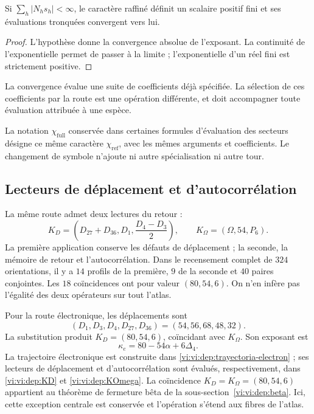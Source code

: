 \begin{proposition}
Si \(\sum_h|N_hs_h|<\infty\), le caractère raffiné définit un scalaire
positif fini et ses évaluations tronquées convergent vers lui.
\end{proposition}
\begin{proof}
L’hypothèse donne la convergence absolue de l’exposant. La continuité de
l’exponentielle permet de passer à la limite ; l’exponentielle d’un réel fini est
strictement positive.
\end{proof}

La convergence évalue une suite de coefficients déjà spécifiée.
La sélection de ces coefficients par la route est une opération différente,
et doit accompagner toute évaluation attribuée à une espèce.

La notation \(\chi_{\mathrm{full}}\) conservée dans certaines formules
d’évaluation des secteurs désigne ce même caractère
\(\chi_{\mathrm{ref}}\), avec les mêmes arguments et coefficients.
Le changement de symbole n’ajoute ni autre spécialisation ni autre tour.

\subsection{Lecteurs de déplacement et d’autocorrélation}

La même route admet deux lectures du retour :
\[
 K_D=\left(D_{27}+D_{36},D_1,\frac{D_4-D_3}{2}\right),\qquad
 K_\Omega=(\Omega,54,P_6).
\]
La première application conserve les défauts de déplacement ; la seconde, la mémoire de
retour et l’autocorrélation. Dans le recensement complet de \(324\) orientations,
il y a \(14\) profils de la première, \(9\) de la seconde et \(40\) paires
conjointes. Les \(18\) coïncidences ont pour valeur \((80,54,6)\).
On n’en infère pas l’égalité des deux opérateurs sur tout l’atlas.

Pour la route électronique, les déplacements sont
\[
 (D_1,D_3,D_4,D_{27},D_{36})=(54,56,68,48,32).
\]
La substitution produit \(K_D=(80,54,6)\), coïncidant avec
\(K_\Omega\). Son exposant est
\[
 \kappa_e=80-54\alpha+6\Delta_4.
\]
La trajectoire électronique est construite dans
\eqref{vi:vi:dep:trayectoria-electron} ; ses lecteurs de déplacement et
d’autocorrélation sont évalués, respectivement, dans
\eqref{vi:vi:dep:KD} et \eqref{vi:vi:dep:KOmega}. La coïncidence
\(K_D=K_\Omega=(80,54,6)\) appartient au théorème de fermeture bêta de la
sous-section~\ref{vi:vi:dep:beta}. Ici, cette exception centrale est conservée et
l’opération s’étend aux fibres de l’atlas.

